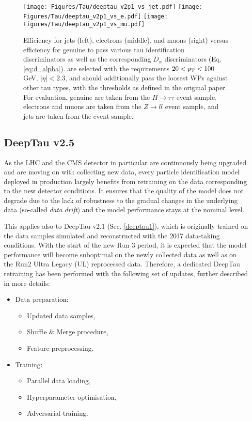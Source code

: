 \begin{figure}[t!]
    \centering
    \texttt{[image: Figures/Tau/deeptau\_v2p1\_vs\_jet.pdf]}
    \texttt{[image: Figures/Tau/deeptau\_v2p1\_vs\_e.pdf]}
    \texttt{[image: Figures/Tau/deeptau\_v2p1\_vs\_mu.pdf]}
    \caption{Efficiency for jets (left), electrons (middle), and muons (right) versus efficiency for genuine \tauh to pass various tau identification discriminators as well as the corresponding $D_\alpha$ discriminators (Eq. \ref{eq:d_alpha}). \tauh are selected with the requirements $20 < p_{\text{T}} < 100$ GeV, $|\eta| < 2.3$, and should additionally pass the loosest WPs against other tau types, with the thresholds as defined in the original paper. For evaluation, genuine \tauh are taken from the $H \to \tau\tau$ event sample, electrons and muons are taken from the $Z \to ll$ event sample, and jets are taken from the \ttbar event sample.}
    \label{fig:deeptau_v2p1_performance}
\end{figure}

\subsection{DeepTau v2.5} \label{deeptau5}
As the LHC and the CMS detector in particular are continuously being upgraded and are moving on with collecting new data, every particle identification model deployed in production largely benefits from retraining on the data corresponding to the new detector conditions. It ensures that the quality of the model does not degrade due to the lack of robustness to the gradual changes in the underlying data (so-called \textit{data drift}) and the model performance stays at the nominal level.

This applies also to DeepTau v2.1 (Sec. \ref{deeptau1}), which is originally trained on the data samples simulated and reconstructed with the 2017 data-taking conditions. With the start of the new Run 3 period, it is expected that the model performance will become suboptimal on the newly collected data as well as on the Run2 Ultra Legacy (UL) reprocessed data. Therefore, a dedicated DeepTau retraining has been performed with the following set of updates, further described in more details: 

\begin{itemize}
    \item Data preparation:
    \begin{itemize}
        \item Updated data samples,
        \item Shuffle \& Merge procedure,
        \item Feature preprocessing.
    \end{itemize}
    \item Training:
    \begin{itemize}
        \item Parallel data loading,
        \item Hyperparameter optimisation,
        \item Adversarial training.
    \end{itemize}
\end{itemize}

